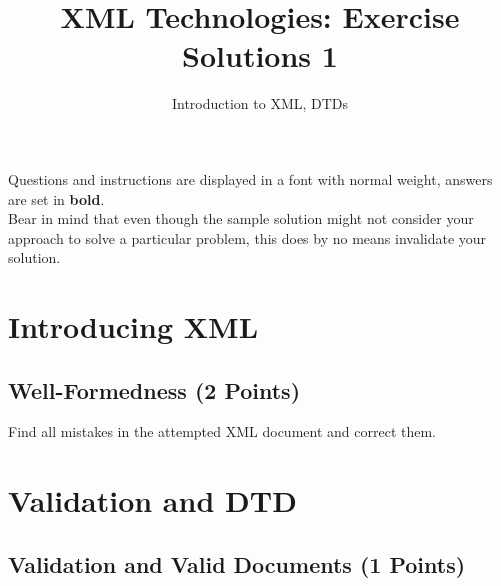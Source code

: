 \documentclass[a4paper, 12pt]{scrartcl}
\title{XML Technologies: Exercise Solutions 1}
\date{}
\subtitle{Introduction to XML, DTDs}
\begin{document}
\maketitle\vspace{-5ex}

\noindent Questions and instructions are displayed in a font with normal weight, answers are set in \textbf{bold}. \\

\noindent Bear in mind that even though the sample solution might not consider your approach to solve a particular problem, this does by no means invalidate your solution. 

\section{Introducing XML}

\subsection{Well-Formedness (2 Points)}

Find all mistakes in the attempted XML document and correct them. \\



\section{Validation and DTD}

\subsection{Validation and Valid Documents (1 Points)}
\end{document}

